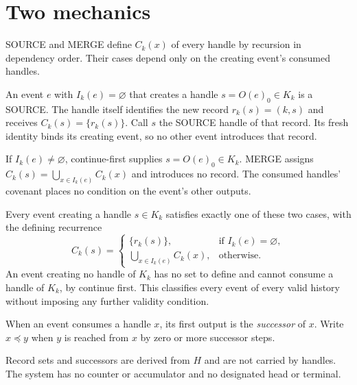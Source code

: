 \documentclass[../main.tex]{subfiles}
\begin{document}
\section{Two mechanics}
\label{sec:kpc:operations}

SOURCE and MERGE define $C_k(x)$ of every handle by recursion in dependency
order. Their cases depend only on the creating event's consumed handles.

\begin{operation}[SOURCE]
\label{op:kpc-operations:source}
An event $e$ with $I_k(e)=\varnothing$ that creates a handle
$s=O(e)_0\in K_k$ is a SOURCE. The handle itself identifies the new record
$r_k(s)=(k,s)$ and receives $C_k(s)=\{r_k(s)\}$.
Call $s$ the SOURCE handle of that record. Its fresh identity binds its
creating event, so no other event introduces that record.
\end{operation}

\begin{operation}[MERGE]
\label{op:kpc-operations:merge}
If $I_k(e)\ne\varnothing$, continue-first supplies $s=O(e)_0\in K_k$.
MERGE assigns $C_k(s)=\bigcup_{x\in I_k(e)}C_k(x)$ and introduces no record.
The consumed handles' covenant places no condition on the event's other
outputs.
\end{operation}

\begin{definition}
\label{def:kpc-operations:classification}
Every event creating a handle $s\in K_k$ satisfies exactly one of these
two cases, with the defining recurrence
\[
 C_k(s)=
 \begin{cases}
 \{r_k(s)\},&\text{if }I_k(e)=\varnothing,\\
 \displaystyle\bigcup_{x\in I_k(e)}C_k(x),&\text{otherwise}.
 \end{cases}
\]
An event creating no handle of $K_k$ has no set to define and cannot
consume a handle of $K_k$, by continue first. This classifies every event of every valid
history without imposing any further validity condition.
\end{definition}

\begin{definition}[Continuation]
\label{def:kpc-operations:continuation}
When an event consumes a handle $x$, its first output is the
\emph{successor} of $x$. Write $x\preceq y$ when $y$ is reached from $x$
by zero or more successor steps.
\end{definition}

Record sets and successors are derived from $H$ and are not carried by
handles. The system has no counter or accumulator and no designated head or terminal.
\end{document}
